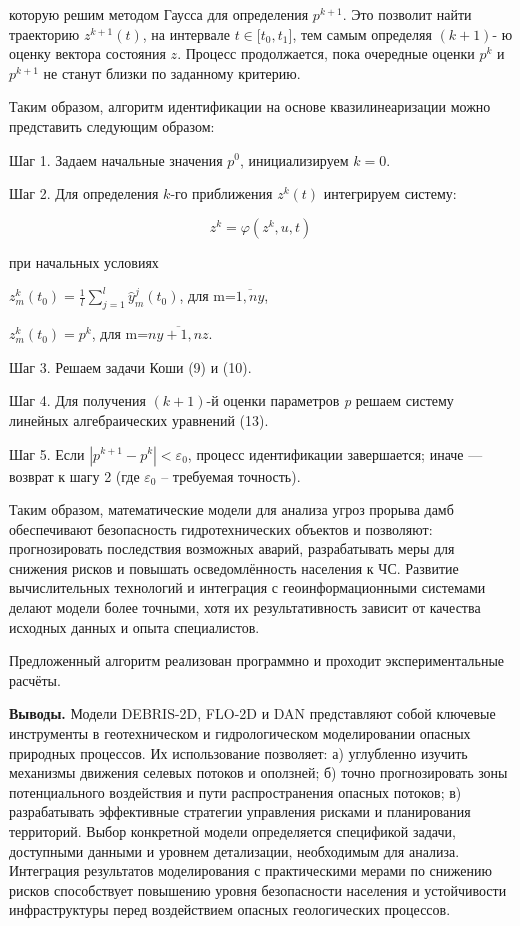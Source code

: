 \begin{multicols}{2}
которую решим методом Гаусса для определения
\(p^{k + 1}\). Это позволит найти траекторию
\(z^{k + 1}(t)\), на интервале
\(t \in \lbrack t_{0},t_{1}\rbrack\), тем самым определяя \((k + 1)\)- ю
оценку вектора состояния \(z\). Процесс продолжается, пока очередные
оценки \(p^{k}\) и
\(p^{k + 1}\) не станут близки по заданному
критерию.

Таким образом, алгоритм идентификации на основе квазилинеаризации можно
представить следующим образом:

Шаг 1. Задаем начальные значения \(p^{0}\),
инициализируем \(k = 0\).

Шаг 2. Для определения \(k\)-го приближения
\(z^{k}(t)\) интегрируем систему:

\[{z}^{k} = \varphi(z^{k},u,t)\]

при начальных условиях

\(z_{m}^{k}\left( t_{0} \right) = \frac{1}{l}\sum_{j = 1}^{l}{{\widehat{y}}_{m}^{j}(t_{0})}\),
для m=\(\overline{1,ny}\),

\(z_{m}^{k}\left( t_{0} \right) = p^{k}\),
для m=\(\overline{ny + 1,nz}\).

Шаг 3. Решаем задачи Коши (9) и (10).

Шаг 4. Для получения \((k + 1)\)-й оценки параметров \emph{p} решаем
систему линейных алгебраических уравнений (13).

Шаг 5. Если
\(\left| p^{k + 1} - p^{k} \right| < \varepsilon_{0}\),
процесс идентификации завершается; иначе --- возврат к шагу 2 (где
\(\varepsilon_{0}\) -- требуемая точность).

Таким образом, математические модели для анализа угроз прорыва дамб
обеспечивают безопасность гидротехнических объектов и позволяют:
прогнозировать последствия возможных аварий, разрабатывать меры для
снижения рисков и повышать осведомлённость населения к ЧС. Развитие
вычислительных технологий и интеграция с геоинформационными системами
делают модели более точными, хотя их результативность зависит от
качества исходных данных и опыта специалистов.

Предложенный алгоритм реализован программно и проходит экспериментальные
расчёты.

{\bfseries Выводы.} Модели DEBRIS-2D, FLO-2D и DAN представляют собой
ключевые инструменты в геотехническом и гидрологическом моделировании
опасных природных процессов. Их использование позволяет: а) углубленно
изучить механизмы движения селевых потоков и оползней; б) точно
прогнозировать зоны потенциального воздействия и пути распространения
опасных потоков; в) разрабатывать эффективные стратегии управления
рисками и планирования территорий. Выбор конкретной модели определяется
спецификой задачи, доступными данными и уровнем детализации, необходимым
для анализа. Интеграция результатов моделирования с практическими мерами
по снижению рисков способствует повышению уровня безопасности населения
и устойчивости инфраструктуры перед воздействием опасных геологических
процессов.


\end{multicols}
